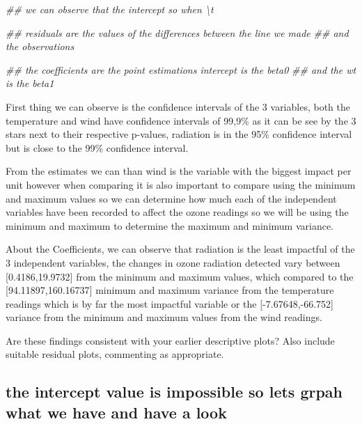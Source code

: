 \documentclass[
  a4paper,
  DIV=11,
  numbers=noendperiod]{scrartcl}
\newenvironment{Shaded}{\begin{snugshade}}{\end{snugshade}}
\newcommand{\DocumentationTok}[1]{\textcolor[rgb]{0.37,0.37,0.37}{\textit{#1}}}
\begin{document}
\begin{Shaded}
\begin{Highlighting}[]
\DocumentationTok{\#\# we can observe that the intercept so when \textbackslash{}t}

\DocumentationTok{\#\# residuals are the values of the differences between the line we made}
\DocumentationTok{\#\# and the observations}

\DocumentationTok{\#\# the coefficients are the point estimations intercept is the beta0}
\DocumentationTok{\#\# and the wt is the beta1}
\end{Highlighting}
\end{Shaded}

First thing we can observe is the confidence intervals of the 3
variables, both the temperature and wind have confidence intervals of
99,9\% as it can be see by the 3 stars next to their respective
p-values, radiation is in the 95\% confidence interval but is close to
the 99\% confidence interval.

From the estimates we can than wind is the variable with the biggest
impact per unit however when comparing it is also important to compare
using the minimum and maximum values so we can determine how much each
of the independent variables have been recorded to affect the ozone
readings so we will be using the minimum and maximum to determine the
maximum and minimum variance.

About the Coefficients, we can observe that radiation is the least
impactful of the 3 independent variables, the changes in ozone radiation
detected vary between {[}0.4186,19.9732{]} from the minimum and maximum
values, which compared to the {[}94.11897,160.16737{]} minimum and
maximum variance from the temperature readings which is by far the most
impactful variable or the {[}-7.67648,-66.752{]} variance from the
minimum and maximum values from the wind readings.

Are these findings consistent with your earlier descriptive plots? Also
include suitable residual plots, commenting as appropriate.

\hypertarget{the-intercept-value-is-impossible-so-lets-grpah-what-we-have-and-have-a-look}{%
\subsection{the intercept value is impossible so lets grpah what we have
and have a
look}\label{the-intercept-value-is-impossible-so-lets-grpah-what-we-have-and-have-a-look}}
\end{document}
